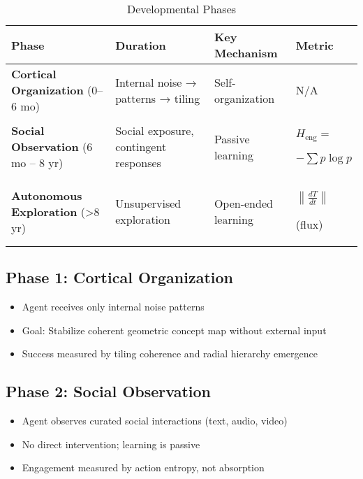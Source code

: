 \documentclass[10pt]{article}
\begin{document}
\begin{table}[H]
\centering
\caption{Developmental Phases}
\renewcommand{\arraystretch}{1.2}
\begin{tabular}{
    >{\raggedright\arraybackslash}p{4.2cm}
    >{\raggedright\arraybackslash}p{3.6cm}
    >{\raggedright\arraybackslash}p{3.0cm}
    >{\centering\arraybackslash}p{3.0cm}
}
\toprule
\textbf{Phase} & \textbf{Duration} & \textbf{Key Mechanism} & \textbf{Metric} \\
\midrule

\textbf{Cortical Organization} (0–6 mo)
& Internal noise → patterns → tiling
& Self-organization
& \mbox{N/A} \\

\addlinespace

\textbf{Social Observation} (6 mo – 8 yr)
& Social exposure, contingent responses
& Passive learning
& \mbox{$H_{\text{eng}} = $} \par \mbox{$-\sum p \log p$} \\

\addlinespace

\textbf{Autonomous Exploration} (>8 yr)
& Unsupervised exploration
& Open-ended learning
& \mbox{$\left\|\frac{dT}{dt}\right\|$} \par {\footnotesize (flux)} \\

\bottomrule
\end{tabular}
\end{table}

\subsection{Phase 1: Cortical Organization}
\begin{itemize}
    \item Agent receives only internal noise patterns
    \item Goal: Stabilize coherent geometric concept map without external input
    \item Success measured by tiling coherence and radial hierarchy emergence
\end{itemize}

\subsection{Phase 2: Social Observation}  
\begin{itemize}
    \item Agent observes curated social interactions (text, audio, video)
    \item No direct intervention; learning is passive
    \item Engagement measured by action entropy, not absorption
\end{itemize}
\end{document}
